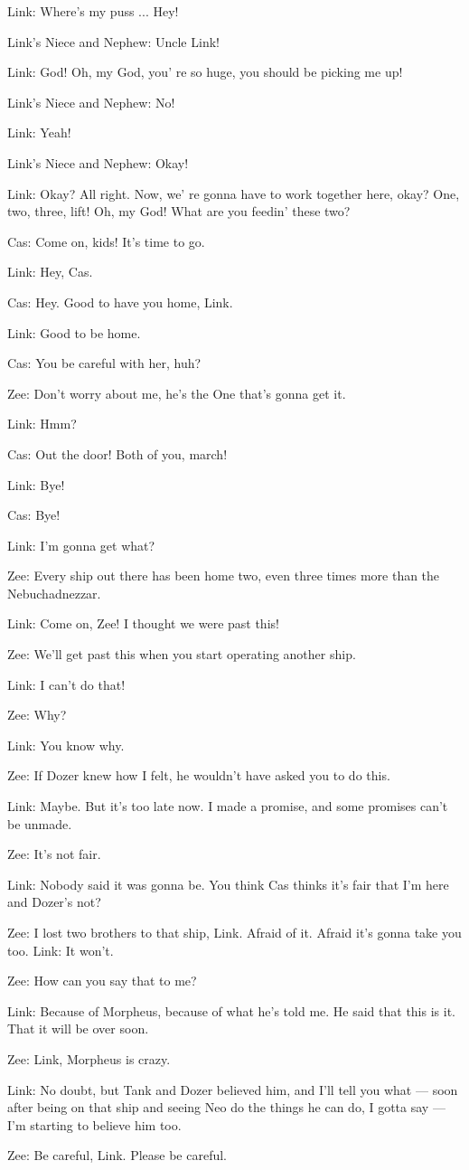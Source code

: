 \documentclass[UTF8]{ctexart}
\newenvironment{myquote}{\color{green} \setlength{\leftskip}{6em} \setlength{\rightskip}{4em} \setlength{\parindent}{-2em}}{\par}
\begin{document}
\begin{myquote}
Link: Where's my puss ... Hey!

Link's Niece and Nephew: Uncle Link!

Link: God! Oh, my God, you' re so huge, you should be picking me up!

Link's Niece and Nephew: No!

Link: Yeah!

Link's Niece and Nephew: Okay!

Link: Okay? All right. Now, we' re gonna have to work together here, okay? One, two, three, lift! Oh, my God! What are you feedin' these two?

Cas: Come on, kids! It's time to go.

Link: Hey, Cas.

Cas: Hey. Good to have you home, Link.

Link: Good to be home.

Cas: You be careful with her, huh?

Zee: Don't worry about me, he's the One that's gonna get it.

Link: Hmm?

Cas: Out the door! Both of you, march!

Link: Bye!

Cas: Bye!

Link: I'm gonna get what?

Zee: Every ship out there has been home two, even three times more than the Nebuchadnezzar.

Link: Come on, Zee! I thought we were past this!

Zee: We'll get past this when you start operating another ship.

Link: I can't do that!

Zee: Why?

Link: You know why.

Zee: If Dozer knew how I felt, he wouldn't have asked you to do this.

Link: Maybe. But it's too late now. I made a promise, and some promises can't be unmade.

Zee: It's not fair.

Link: Nobody said it was gonna be. You think Cas thinks it's fair that I'm here and Dozer's not?

Zee: I lost two brothers to that ship, Link. Afraid of it. Afraid it's gonna take you too. Link: It won't.

Zee: How can you say that to me?

Link: Because of Morpheus, because of what he's told me. He said that this is it. That it will be over soon.

Zee: Link, Morpheus is crazy.

Link: No doubt, but Tank and Dozer believed him, and I'll tell you what --- soon after being on that ship and seeing Neo do the things he can do, I gotta say --- I'm starting to believe him too.

Zee: Be careful, Link. Please be careful.
\end{myquote}
\end{document}

